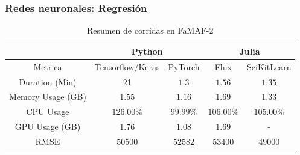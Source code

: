 \documentclass[11pt]{article}
\let\Oldsubsubsection\subsubsection
\renewcommand{\subsubsection}{\FloatBarrier\Oldsubsubsection}
\begin{document}
\subsubsection{Redes neuronales: Regresión}

\begin{table}[H]
\centering
\begin{tabular}{|c|c|c|c|c|}
\hline
& \multicolumn{2}{c|}{Python} & \multicolumn{2}{c|}{Julia} \\ \hline
Metrica & Tensorflow/Keras & PyTorch & Flux & SciKitLearn \\ \hline
Duration (Min) & 21 & $1.3$ & $1.56$ & $1.35$ \\ \hline
Memory Usage (GB) & $1.55$ & $1.16$ & $1.69$ & $1.33$ \\ \hline
CPU Usage & $126.00\%$ & $99.99\%$& $106.00\%$& $105.00\%$\\ \hline
GPU Usage (GB) & $1.76$ & $1.08$ & $1.69$ & - \\ \hline
RMSE & $50500$ & $52582$ & $53400$ & $49000$ \\ \hline
\end{tabular}
\caption{Resumen de corridas en FaMAF-2}
\label{tab:my-table}
\end{table}
\end{document}
